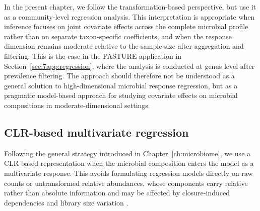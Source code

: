 In the present chapter, we follow the transformation-based perspective, but use it as a community-level regression analysis. This interpretation is appropriate when inference focuses on joint covariate effects across the complete microbial profile rather than on separate taxon-specific coefficients, and when the response dimension remains moderate relative to the sample size after aggregation and filtering. This is the case in the PASTURE application in Section~\ref{sec:7app:regression}, where the analysis is conducted at genus level after prevalence filtering. The approach should therefore not be understood as a general solution to high-dimensional microbial response regression, but as a pragmatic model-based approach for studying covariate effects on microbial compositions in moderate-dimensional settings.

\subsection{CLR-based multivariate regression}
\label{sec:3community:regression:clr_model}

Following the general strategy introduced in Chapter~\ref{ch:microbiome}, we use a CLR-based representation when the microbial composition enters the model as a multivariate response. This avoids formulating regression models directly on raw counts or untransformed relative abundances, whose components carry relative rather than absolute information and may be affected by closure-induced dependencies and library size variation \citep{aitchison1986statistical,gloor2017microbiome,quinn2019field}. 

